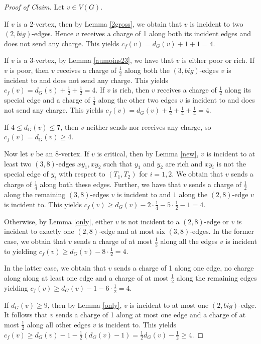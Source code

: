 \documentclass{article}
\theoremstyle{plain}
\theoremstyle{nonumberplain}
\theoremstyle{nonumberplain}
\begin{document}
\begin{proof}[Proof of Claim]
Let $v \in V(G)$. 


If $v$ is a 2-vertex, then by Lemma \ref{2gross}, we obtain that $v$ is incident to two $(2,big)$-edges. Hence $v$ receives a charge of 1 along both its incident edges and does not send any charge. This yields $c_f(v)=d_G(v)+1+1=4$.

If $v$ is a 3-vertex, by Lemma \ref{aumoins23}, we have that $v$ is either poor or rich. If $v$ is poor, then $v$ receives a charge of $\frac{1}{2}$ along both the $(3,big)$-edges $v$ is incident to and does not send any charge. This yields $c_f(v)=d_G(v)+\frac{1}{2}+\frac{1}{2}=4$.  If $v$ is rich, then $v$ receives a charge of $\frac{1}{2}$ along its special edge and a charge of $\frac{1}{4}$ along the other two edges  $v$ is incident to and does not send any charge. This yields $c_f(v)=d_G(v)+\frac{1}{2}+\frac{1}{4}+\frac{1}{4}=4$.


If $4 \leq d_G(v) \leq 7$, then $v$ neither sends nor receives any charge, so $c_f(v)=d_G(v)\geq 4$.

Now let $v$ be an 8-vertex. If $v$ is critical, then by Lemma \ref{new}, $v$ is incident to at least two $(3,8)$-edges $xy_1,xy_2$ such that $y_1$ and $y_2$ are rich and $xy_i$ is not the special edge of $y_i$ with respect to $(T_1,T_2)$ for $i=1,2$. We obtain that $v$ sends a charge of $\frac{1}{4}$ along both these edges. Further, we have that $v$ sends a charge of $\frac{1}{2}$ along the remaining $(3,8)$-edges $v$ is incident to and $1$ along the $(2,8)$-edge $v$ is incident to. This yields $c_f(v)\geq d_G(v)-2 \cdot \frac{1}{4}-5 \cdot \frac{1}{2}-1=4$.

 Otherwise, by Lemma \ref{only}, either $v$ is not incident to a $(2,8)$-edge or $v$ is incident to exactly one $(2,8)$-edge and at most six $(3,8)$-edges. In the former case, we obtain that $v$ sends a charge of at most $\frac{1}{2}$ along all the edges $v$ is incident to yielding $c_f(v)\geq d_G(v)-8\cdot \frac{1}{2}=4$.

  In the latter case, we obtain that $v$ sends a charge of 1 along one edge, no charge along along at least one edge and a charge of at most $\frac{1}{2}$ along the remaining edges yielding $c_f(v)\geq d_G(v)-1-6\cdot \frac{1}{2}=4$. 

If $d_G(v)\geq 9$, then by Lemma \ref{only}, $v$ is incident to at most one $(2,big)$-edge. It follows that $v$ sends a charge of 1 along at most one edge and a charge of at most $\frac{1}{2}$ along all other edges $v$ is incident to. This yields $c_f(v)\geq d_G(v)-1-\frac{1}{2}(d_G(v)-1)=\frac{1}{2}d_G(v)-\frac{1}{2}\geq 4$.
\renewcommand{\qedsymbol}{$\blacksquare$}
\end{proof}
\end{document}

